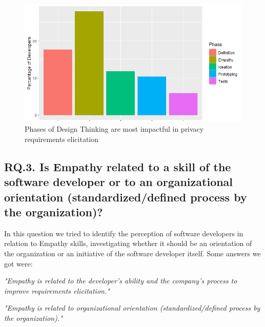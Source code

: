 \documentclass[conference]{IEEEtran}
\begin{document}
\begin{figure}
    \centering
    \includegraphics[width=5.5in]{Figures/RQ15.png}
    \caption{Phases of Design Thinking are most impactful in privacy requirements elicitation}
    \label{fig:impactos}
\end{figure}

\subsection{RQ.3. Is Empathy related to a skill of the software developer or to an organizational orientation (standardized/defined process by the organization)?}


In this question we tried to identify the perception of software developers in relation to Empathy skills, investigating whether it should be an orientation of the organization or an initiative of the software developer itself. Some answers we got were:

\begin{mq}
\emph{"Empathy is related to the developer's ability and the company's process to improve requirements elicitation."}
\end{mq}

\begin{mq}
\emph{"Empathy is related to organizational orientation (standardized/defined process by the organization)."}
\end{mq}
\end{document}
